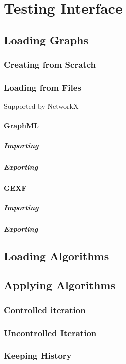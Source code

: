 \section{Testing Interface}
\label{sec:interface-testing}

\subsection{Loading Graphs}
\subsubsection{Creating from Scratch}
\subsubsection{Loading from Files}
Supported by NetworkX~\parencite{hagberg:networkx}
\paragraph{GraphML}
\subparagraph{Importing}
\subparagraph{Exporting}

\paragraph{GEXF}
\subparagraph{Importing}
\subparagraph{Exporting}

\subsection{Loading Algorithms} %
\subsection{Applying Algorithms}
\subsubsection{Controlled iteration}
\subsubsection{Uncontrolled Iteration}
\subsubsection{Keeping History}

